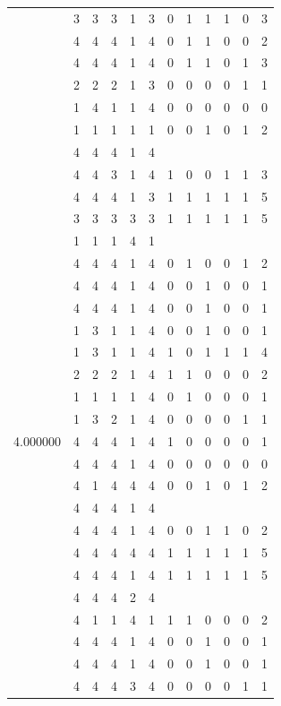 \documentclass[]{book}
\theoremstyle{definition}
\theoremstyle{definition}
\theoremstyle{definition}
\theoremstyle{remark}
\begin{document}
\begin{table}
{\begin{tabular}[t]{rrrrrrrrrrrr}
 & 3 & 3 & 3 & 1 & 3 & 0 & 1 & 1 & 1 & 0 & 3\\
 & 4 & 4 & 4 & 1 & 4 & 0 & 1 & 1 & 0 & 0 & 2\\
 & 4 & 4 & 4 & 1 & 4 & 0 & 1 & 1 & 0 & 1 & 3\\
 & 2 & 2 & 2 & 1 & 3 & 0 & 0 & 0 & 0 & 1 & 1\\
 & 1 & 4 & 1 & 1 & 4 & 0 & 0 & 0 & 0 & 0 & 0\\
 & 1 & 1 & 1 & 1 & 1 & 0 & 0 & 1 & 0 & 1 & 2\\
 & 4 & 4 & 4 & 1 & 4 &  &  &  &  &  & \\
 & 4 & 4 & 3 & 1 & 4 & 1 & 0 & 0 & 1 & 1 & 3\\
 & 4 & 4 & 4 & 1 & 3 & 1 & 1 & 1 & 1 & 1 & 5\\
 & 3 & 3 & 3 & 3 & 3 & 1 & 1 & 1 & 1 & 1 & 5\\
 & 1 & 1 & 1 & 4 & 1 &  &  &  &  &  & \\
 & 4 & 4 & 4 & 1 & 4 & 0 & 1 & 0 & 0 & 1 & 2\\
 & 4 & 4 & 4 & 1 & 4 & 0 & 0 & 1 & 0 & 0 & 1\\
 & 4 & 4 & 4 & 1 & 4 & 0 & 0 & 1 & 0 & 0 & 1\\
 & 1 & 3 & 1 & 1 & 4 & 0 & 0 & 1 & 0 & 0 & 1\\
 & 1 & 3 & 1 & 1 & 4 & 1 & 0 & 1 & 1 & 1 & 4\\
 & 2 & 2 & 2 & 1 & 4 & 1 & 1 & 0 & 0 & 0 & 2\\
 & 1 & 1 & 1 & 1 & 4 & 0 & 1 & 0 & 0 & 0 & 1\\
 & 1 & 3 & 2 & 1 & 4 & 0 & 0 & 0 & 0 & 1 & 1\\
4.000000 & 4 & 4 & 4 & 1 & 4 & 1 & 0 & 0 & 0 & 0 & 1\\
 & 4 & 4 & 4 & 1 & 4 & 0 & 0 & 0 & 0 & 0 & 0\\
 & 4 & 1 & 4 & 4 & 4 & 0 & 0 & 1 & 0 & 1 & 2\\
 & 4 & 4 & 4 & 1 & 4 &  &  &  &  &  & \\
 & 4 & 4 & 4 & 1 & 4 & 0 & 0 & 1 & 1 & 0 & 2\\
 & 4 & 4 & 4 & 4 & 4 & 1 & 1 & 1 & 1 & 1 & 5\\
 & 4 & 4 & 4 & 1 & 4 & 1 & 1 & 1 & 1 & 1 & 5\\
 & 4 & 4 & 4 & 2 & 4 &  &  &  &  &  & \\
 & 4 & 1 & 1 & 4 & 1 & 1 & 1 & 0 & 0 & 0 & 2\\
 & 4 & 4 & 4 & 1 & 4 & 0 & 0 & 1 & 0 & 0 & 1\\
 & 4 & 4 & 4 & 1 & 4 & 0 & 0 & 1 & 0 & 0 & 1\\
 & 4 & 4 & 4 & 3 & 4 & 0 & 0 & 0 & 0 & 1 & 1\\

\end{tabular}}
\end{table}
\end{document}
